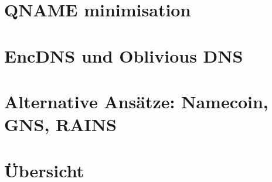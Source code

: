 \section{QNAME minimisation}

\section{EncDNS und Oblivious DNS}

\section{Alternative Ansätze: Namecoin, GNS, RAINS}

\section{Übersicht}
